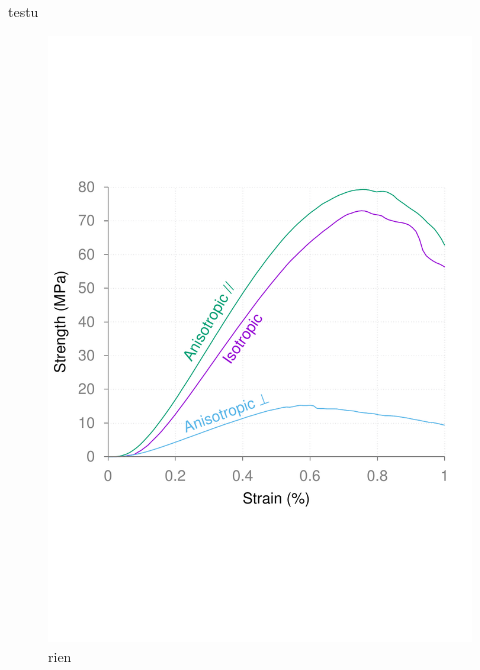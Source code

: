 \documentclass{article}
\begin{document}
	testu
	\begin{figure}[ht]
		\centering
		\includegraphics[width=\linewidth]{figures/sup_fig1}
		\caption{rien}
		\label{a}
	\end{figure}
\end{document}
